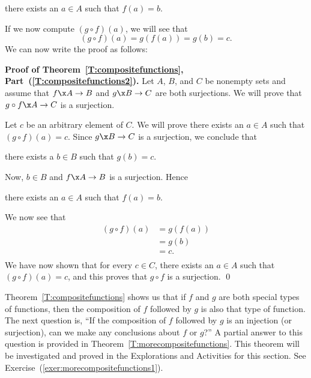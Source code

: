 \begin{center}
there exists an  $a \in A$  such that  $f( a ) = b$.
\end{center}

\noindent
If we now compute  $( {g \circ f} )( a )$, we will see that
\[
( {g \circ f} )( a ) = g \left( f ( a ) \right) = g ( b ) = c.
\]
We can now write the proof as follows:
\eighth

\noindent
\textbf{Proof of Theorem~\ref{T:compositefunctions}, Part~(\ref{T:compositefunctions2}).}
Let  $A$, $B$, and  $C$  be nonempty sets and assume that  $f\x A \to B$  and  $g\x B \to C$  are both surjections.  We will prove that  $g \circ f\x A \to C$  is a surjection.

Let  $c$ be an arbitrary element of  $C$.  We will prove there exists an $a \in A$ such that 
$( g \circ f ) ( a ) = c$.  Since  $g\x B \to C$  is a surjection, we conclude that

\begin{center}
there exists a  $b \in B$  such that  $g( b ) = c$.
\end{center}

\noindent
Now, $b \in B$  and   $f\x A \to B$  is a surjection.  Hence 

\begin{center}
there exists an  $a \in A$  such that  $f( a ) = b$.
\end{center}

\noindent
We now  see that
\[
\begin{aligned}
  ( {g \circ f} )( a ) &= g\left( {f( a )} \right) \\ 
                       &= g( b ) \\ 
                       &= c. \\ 
\end{aligned} 
\]
We have now shown that for every  $c \in C$, there exists an  $a \in A$  such that  $( {g \circ f} )( a ) = c$, and this proves that  $g \circ f$  is a surjection. \qed

Theorem~\ref{T:compositefunctions} shows us that if $f$ and $g$ are both special types of functions, then the composition of $f$ followed by $g$ is also that type of function.  The next question is, ``If the composition of $f$ followed by $g$ is an injection (or surjection), can we make any conclusions about $f$ or $g$?''  A partial answer to this question is provided in Theorem~\ref{T:morecompositefunctions}.  This theorem will be investigated and proved in the Explorations and Activities for this section.  See 
Exercise~(\ref{exer:morecompositefunctions1}).

